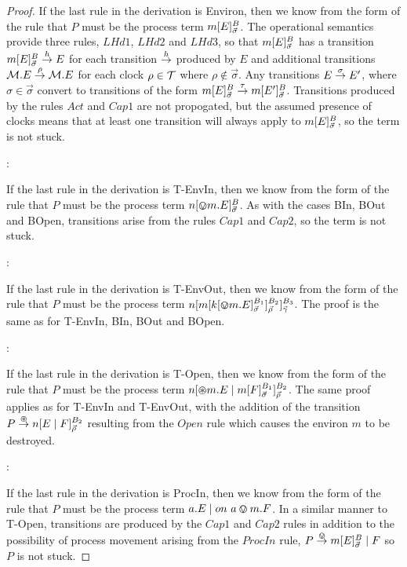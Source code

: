 \begin{proof}
\noindent If the last rule in the derivation is Environ, then we know
from the form of the rule that $P$ must be the process term
${m}[ E ]^{B}_{\vec{\sigma}}$.  The operational semantics provide
three rules, $LHd1$, $LHd2$ and $LHd3$, so that
${m}[ E ]^{B}_{\vec{\sigma}}$ has a transition
${m}[ E ]^{B}_{\vec{\sigma}} \stackrel{h}{\rightarrow} E$ for each transition
$\stackrel{h}{\rightarrow}$ produced by $E$ and additional transitions $\text{$\mathcal{M}$}.E
\stackrel{\rho}{\rightarrow} \text{$\mathcal{M}$}.E$ for each clock $\rho \in \text{$\mathcal{T}$}$ where $\rho
\not \in \vec{\sigma}$.  Any transitions $E \stackrel{\sigma}{\rightarrow} E'$,
where $\sigma \in \vec{\sigma}$ convert to transitions of the form
${m}[ E ]^{B}_{\vec{\sigma}} \stackrel{\tau}{\rightarrow}
{m}[ E' ]^{B}_{\vec{\sigma}}$.  Transitions produced by the rules
$Act$ and $Cap1$ are not propogated, but the assumed presence of
clocks means that at least one transition will always apply to
${m}[ E ]^{B}_{\vec{\sigma}}$, so the term is not stuck.

:

\noindent If the last rule in the derivation is T-EnvIn, then we know
from the form of the rule that $P$ must be the process term
${n}[ \varovee m.E ]^{B}_{\vec{\sigma}}$.  As with the cases BIn, BOut
and BOpen, transitions arise from the rules $Cap1$ and $Cap2$, so the
term is not stuck.

:

\noindent If the last rule in the derivation is T-EnvOut, then we know
from the form of the rule that $P$ must be the process term
${n}[ {m}[ {k}[ \varovee m.E ]^{B_1}_{\vec{\sigma}} ]^{B_2}_{\vec{\rho}} ]^{B_3}_{\vec{\gamma}}$.
The proof is the same as for T-EnvIn, BIn, BOut and BOpen.

:

\noindent If the last rule in the derivation is T-Open, then we know
from the form of the rule that $P$ must be the process term
${n}[ \varoast m.E \;|\;
  {m}[ F ]^{B_1}_{\vec{\sigma}} ]^{B_2}_{\vec{\rho}}$.  The same proof
applies as for T-EnvIn and T-EnvOut, with the addition of the
transition $P \stackrel{\varoast}{\rightarrow} {n}[ E \;|\; F ]^{B_2}_{\vec{\rho}}$
resulting from the $Open$ rule which causes the environ $m$ to be
destroyed.

:

\noindent If the last rule in the derivation is ProcIn, then we know
from the form of the rule that $P$ must be the process term $a.E \;|\;
on\ a \varovee m.F$.  In a similar manner to T-Open, transitions are
produced by the $Cap1$ and $Cap2$ rules in addition to the possibility
of process movement arising from the $ProcIn$ rule, $P \stackrel{\varovee}{\rightarrow}
{m}[ E ]^{B}_{\vec{\sigma}} \;|\; F$ so $P$ is not stuck.


\end{proof}
